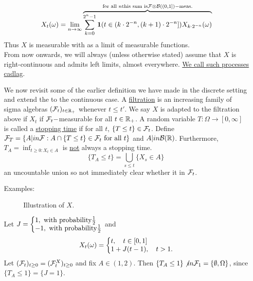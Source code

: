 \documentclass{article}
\begin{document}
\[
	X_{t}(\omega) = \lim_{n \to \infty}\displaystyle\overbrace{\displaystyle\sum^{2^{n}-1}_{k=0}  \mathbf{1}(t\in (k\cdot 2^{-n}, (k+1)\cdot 2^{-n}])X_{k\cdot 2^{-n}}(\omega) }^{\text{for all }n \text{this sum is} \mathcal{F}\otimes \mathcal{B}((0,1])-\text{meas.} }
\]
Thus $ X$ is measurable with as a limit of measurable functions.\\ 

From now onwards, we will always (unless otherwise stated) assume that $ X$ is right-continuous and admits left limits, almost everywhere. \underline{We call such processes cadlag}.


We now revisit some of the earlier definition we have made in the discrete setting and extend the to the continuous case. A \underline{filtration} is an increasing family of sigma algebras $ (\mathcal{F}_{t})_{t\in \mathbb{R}_{+}}$ whenever $ t\leq t'$. We say $ X$ is adapted to the filtration above if $ X_{t}$ if $ \mathcal{F}_{t}-$measurable for all $t\in \mathbb{R}_{+}$. A random variable $ T:\Omega \to [0,\infty]$ is called a \underline{stopping time} if for all $ t$, $ \{T\leq t\}\in \mathcal{F}_{t}
$. Define $ \mathcal{F}_{T} = \{A|in \mathcal{F}: A\cap \{T\leq t\}\in \mathcal{F}_{t} \text{ for all } t\}$ and $ A|in \mathcal{B}(\mathbb{R})$. Furthermore, $ T_{A} = \displaystyle\inf_{t\geq 0 : X_{t}\in A}$ is \underline{not} always a stopping time.\\ 
\[
	\{T_{A}\leq t\} = \bigcup_{s\leq t} \{X_{s}\in A\}\,
\]
an uncountable union so not immediately clear whether it in $ \mathcal{F}_{t}$.\\ 

\begin{examplesblock}{Examples: }\label{examples: 5}

		\begin{wrapfigure}{r}{0.3\textwidth}
		    \centering
		    
		    \caption{Illustration of $ X$.}
		    \label{fig: counterexample stopping time}
		\end{wrapfigure}

	Let $ J= \left\lbrace
	\begin{array}{@{}l@{}}
		1, \text{ with probability} \frac{1}{2} \\
		-1, \text{ with probability} \frac{1}{2}
	\end{array}\right.$
	and 
	\[	X_{t}(\omega) = \left\lbrace
	\begin{array}{@{}l@{}}
		t, \quad t\in [0,1] \\
	1+ J(t-1), \quad t>1.
	\end{array}\right.
	\]
	Let $(\mathcal{F}_{t})_{t\geq 0} = (\mathcal{F}^{X}_{t})_{t\geq 0}$ and fix $ A\in (1,2)$. Then $ \{T_{A}\leq 1\}\not in \mathcal{F}_{1} = \{\emptyset, \Omega\}$, since $\{T_{A}\leq 1\} = \{J = 1\}$.
\end{examplesblock}
\end{document}
